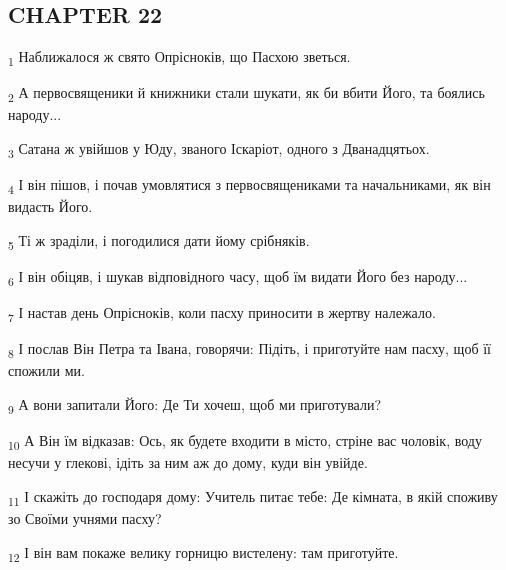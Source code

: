 \subsection{CHAPTER 22}
\begin{tcolorbox}
\textsubscript{1} Наближалося ж свято Опрісноків, що Пасхою зветься.
\end{tcolorbox}
\begin{tcolorbox}
\textsubscript{2} А первосвященики й книжники стали шукати, як би вбити Його, та боялись народу...
\end{tcolorbox}
\begin{tcolorbox}
\textsubscript{3} Сатана ж увійшов у Юду, званого Іскаріот, одного з Дванадцятьох.
\end{tcolorbox}
\begin{tcolorbox}
\textsubscript{4} І він пішов, і почав умовлятися з первосвящениками та начальниками, як він видасть Його.
\end{tcolorbox}
\begin{tcolorbox}
\textsubscript{5} Ті ж зраділи, і погодилися дати йому срібняків.
\end{tcolorbox}
\begin{tcolorbox}
\textsubscript{6} І він обіцяв, і шукав відповідного часу, щоб їм видати Його без народу...
\end{tcolorbox}
\begin{tcolorbox}
\textsubscript{7} І настав день Опрісноків, коли пасху приносити в жертву належало.
\end{tcolorbox}
\begin{tcolorbox}
\textsubscript{8} І послав Він Петра та Івана, говорячи: Підіть, і приготуйте нам пасху, щоб її спожили ми.
\end{tcolorbox}
\begin{tcolorbox}
\textsubscript{9} А вони запитали Його: Де Ти хочеш, щоб ми приготували?
\end{tcolorbox}
\begin{tcolorbox}
\textsubscript{10} А Він їм відказав: Ось, як будете входити в місто, стріне вас чоловік, воду несучи у глекові, ідіть за ним аж до дому, куди він увійде.
\end{tcolorbox}
\begin{tcolorbox}
\textsubscript{11} І скажіть до господаря дому: Учитель питає тебе: Де кімната, в якій споживу зо Своїми учнями пасху?
\end{tcolorbox}
\begin{tcolorbox}
\textsubscript{12} І він вам покаже велику горницю вистелену: там приготуйте.
\end{tcolorbox}
